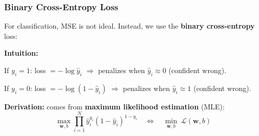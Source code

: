 \documentclass[notes,11pt, aspectratio=169]{beamer}
\newenvironment{wideitemize}{\itemize\addtolength{\itemsep}{10pt}}{\enditemize}
\newcommand{\vx}{\mathbf{x}}
\newcommand{\vw}{\mathbf{w}}
\begin{document}
\begin{frame}
\frametitle{Binary Cross-Entropy Loss}

For classification, MSE is not ideal. Instead, we use the \textbf{binary cross-entropy} loss:


\vspace{8pt}
\textbf{Intuition:}
\begin{wideitemize}
    \item If $y_i = 1$: loss $= -\log \hat{y}_i$ \quad $\Rightarrow$ penalizes when $\hat{y}_i \approx 0$ (confident wrong).
    \item If $y_i = 0$: loss $= -\log(1 - \hat{y}_i)$ \quad $\Rightarrow$ penalizes when $\hat{y}_i \approx 1$ (confident wrong).
\end{wideitemize}

\vspace{6pt}
\textbf{Derivation:} comes from \textbf{maximum likelihood estimation} (MLE):
\[
    \max_{\vw,b} \prod_{i=1}^N \hat{y}_i^{y_i}(1-\hat{y}_i)^{1-y_i} \quad \Leftrightarrow \quad \min_{\vw,b} \; \mathcal{L}(\vw,b)
\]
\end{frame}
\end{document}
